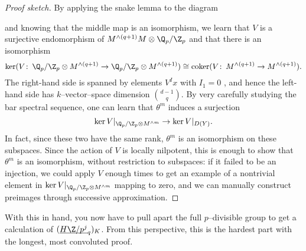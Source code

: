 \begin{proof}[Proof sketch]
By applying the snake lemma to the diagram
\begin{center}
\end{center} 
and knowing that the middle map is an isomorphism, we learn that $V$ is a surjective endomorphism of $M^{\wedge (q+1)} M \otimes \Q_p/\Z_p$ and that there is an isomorphism \[\ker(V\co \Q_p/\Z_p \otimes M^{\wedge (q+1)} \to \Q_p/\Z_p \otimes M^{\wedge (q+1)}) \cong \operatorname{coker}(V\co M^{\wedge (q+1)} \to M^{\wedge (q+1)}).\]  The right-hand side is spanned by elements $V^I x$ with $I_1 = 0$ , and hence the left-hand side has $k$--vector--space dimension $\binom{d-1}{q}$.  By very carefully studying the bar spectral sequence, one can learn that $\theta^m$ induces a surjection \[\ker V|_{\Q_p / \Z_p \otimes M^{\wedge m}} \to \ker V|_{D(Y)}.\]  In fact, since these two have the same rank, $\theta^m$ is an isomorphism on these subspaces.  Since the action of $V$ is locally nilpotent, this is enough to show that $\theta^m$ is an isomorphism, without restriction to subspaces: if it failed to be an injection, we could apply $V$ enough times to get an example of a nontrivial element in $\ker V|_{\Q_p / \Z_p \otimes M^{\wedge m}}$ mapping to zero, and we can manually construct preimages through successive approximation.
\end{proof}

\begin{remark}
With this in hand, you now have to pull apart the full $p$--divisible group to get a calculation of $(\OS{H\Z/p^j}{q})_K$.  From this perspective, this is the hardest part with the longest, most convoluted proof.
\end{remark}

